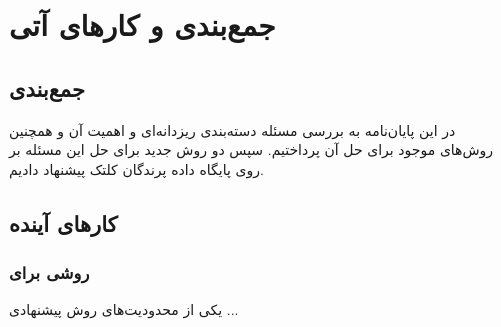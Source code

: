 \chapter{جمع‌بندی و کارهای آتی}\label{chap:chap5}

\section{جمع‌بندی}
در این پایان‌نامه به بررسی مسئله دسته‌بندی ریزدانه‌ای و اهمیت آن و همچنین روش‌های موجود برای حل آن پرداختیم. سپس دو روش جدید برای حل این مسئله بر روی پایگاه داده پرندگان کلتک پیشنهاد دادیم. 

\section{کارهای آینده}

\subsection{روشی برای }
یکی از محدودیت‌های روش پیشنهادی ...